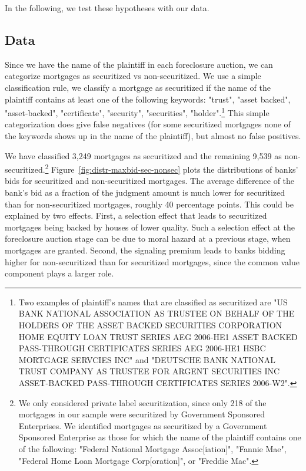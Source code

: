 \documentclass[11pt,twopage]{article}
\begin{document}
In the following, we test these hypotheses with our data.

%

\subsection{Data}

Since we have the name of the plaintiff in each foreclosure auction,
we can categorize mortgages as securitized vs non-securitized. We use
a simple classification rule, we classify a mortgage as securitized if
the name of the plaintiff contains at least one of the following
keywords: "trust", "asset backed", "asset-backed", "certificate",
"security", "securities", "holder".\footnote{Two examples of
  plaintiff's names that are classified as securitized are "US BANK
  NATIONAL ASSOCIATION AS TRUSTEE ON BEHALF OF THE HOLDERS OF THE
  ASSET BACKED SECURITIES CORPORATION HOME EQUITY LOAN TRUST SERIES
  AEG 2006-HE1 ASSET BACKED PASS-THROUGH CERTIFICATES SERIES AEG
  2006-HE1 HSBC MORTGAGE SERVCIES INC" and "DEUTSCHE BANK NATIONAL
  TRUST COMPANY AS TRUSTEE FOR ARGENT SECURITIES INC ASSET-BACKED
  PASS-THROUGH CERTIFICATES SERIES 2006-W2".} This simple
categorization does give false negatives (for some securitized
mortgages none of the keywords shows up in the name of the plaintiff),
but almost no false positives.

We have classified 3,249 mortgages as securitized and the remaining 9,539 as
non-securitized.\footnote{We only considered private label securitization,
since only 218 of the mortgages in our sample were securitized by
Government Sponsored Enterprises. We identified mortgages as securitized
by a Government Sponsored Enterprise as those for which the name of the
plaintiff contains one of the following: "Federal National Mortgage Assoc[iation]",
"Fannie Mae", "Federal Home Loan Mortgage Corp[oration]", or "Freddie Mac".} Figure~\ref{fig:distr-maxbid-sec-nonsec} plots the
distributions of banks' bids for securitized and non-securitized
mortgages. The average difference of the bank's bid as a fraction of
the judgment amount is much lower for securitized than for
non-securitized mortgages, roughly 40 percentage points. This could be
explained by two effects. First, a selection effect that leads to
securitized mortgages being backed by houses of lower quality. Such a
selection effect at the foreclosure auction stage can be due to moral
hazard at a previous stage, when mortgages are granted. Second, the
signaling premium leads to banks bidding higher for non-securitized
than for securitized mortgages, since the common value component plays
a larger role.
\end{document}
